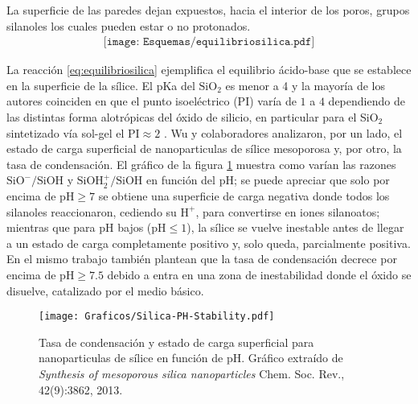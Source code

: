 	La superficie de las paredes dejan expuestos, hacia el interior de los poros, grupos silanoles los cuales pueden estar o no protonados.\cite{Brinker1990,Soler-Illia2011} 
			\begin{equation}
				\begin{aligned}
				\texttt{[image: Esquemas/equilibriosilica.pdf]}
				\label{eq:equilibriosilica}
				\end{aligned}
				\end{equation}

	La reacción \ref{eq:equilibriosilica} ejemplifica el equilibrio ácido-base que se establece en la superficie de la sílice. El pKa del $\text{SiO}_2$ es menor a 4 y la mayoría de los autores coinciden en que el punto isoeléctrico (PI) varía de $1$ a $4$ dependiendo de  las distintas forma alotrópicas del óxido de silicio, en particular para el SiO$_2$ sintetizado vía sol-gel el $\text{PI}\approx 2$ \cite{Kosmulski2002,Kosmulski2014,Schwarz1984,Si-HanWu2013}.
	Wu y colaboradores\cite{Si-HanWu2013} analizaron, por un lado, el estado de carga superficial de nanoparticulas de sílice mesoporosa y, por otro, la tasa de condensación. El gráfico de la figura \ref{fig:silica_ph} muestra como varían las razones  $\text{SiO}^{-}/\text{SiOH}$ y $\text{SiOH}_2^{+}/\text{SiOH}$ en función del pH; se puede apreciar que solo por encima de $\text{pH}\geq7$ se obtiene una superficie de carga negativa donde todos los silanoles reaccionaron, cediendo su $\text{H}^{+}$, para convertirse en iones silanoatos; mientras que para pH bajos ($\text{pH}\leq1$), la sílice se vuelve inestable antes de llegar a un estado de carga completamente positivo y, solo queda, parcialmente positiva. En el mismo trabajo\cite{Si-HanWu2013} también plantean que la tasa de condensación decrece por encima de $\text{pH}\geq7.5$ debido a entra en una zona de inestabilidad donde el óxido se disuelve, catalizado por el medio básico.
			\begin{figure}[th!]
			\centering
 	       	\texttt{[image: Graficos/Silica-PH-Stability.pdf]}
	       		\caption[Tasa de condensación y estado de carga superficial]{Tasa de condensación y estado de carga superficial para nanoparticulas de sílice en función de pH. Gráfico extraído de \textit{Synthesis of mesoporous silica nanoparticles} Chem. Soc. Rev., 42(9):3862, 2013.\cite{Si-HanWu2013}}
	         	\label{fig:silica_ph}
	     		\end{figure}
			
